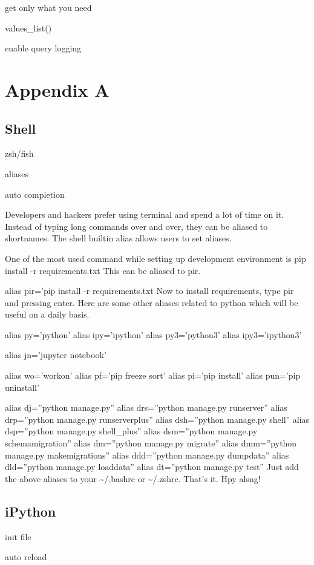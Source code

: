 \documentclass[letterpaper,11pt,english]{sphinxmanual}
\begin{document}
get only what you need

values\_list()

enable query logging


\chapter{Appendix A}
\label{\detokenize{appendix:appendix-a}}\label{\detokenize{appendix::doc}}

\section{Shell}
\label{\detokenize{appendix:shell}}
zsh/fish

aliases

auto completion

Developers and hackers prefer using terminal and spend a lot of time on it. Instead of typing long commands over and over, they can be aliased to shortnames. The shell builtin alias allows users to set aliases.

One of the most used command while setting up development environment is pip install -r requirements.txt This can be aliased to pir.

alias pir=’pip install -r requirements.txt
Now to install requirements, type pir and pressing enter. Here are some other aliases related to python which will be useful on a daily basis.

alias py=’python’
alias ipy=’ipython’
alias py3=’python3’
alias ipy3=’ipython3’

alias jn=’jupyter notebook’

alias wo=’workon’
alias pf=’pip freeze \textbar{} sort’
alias pi=’pip install’
alias pun=’pip uninstall’

alias dj=”python manage.py”
alias drs=”python manage.py runserver”
alias drp=”python manage.py runserverplus”
alias dsh=”python manage.py shell”
alias dsp=”python manage.py shell\_plus”
alias dsm=”python manage.py schemamigration”
alias dm=”python manage.py migrate”
alias dmm=”python manage.py makemigrations”
alias ddd=”python manage.py dumpdata”
alias dld=”python manage.py loaddata”
alias dt=”python manage.py test”
Just add the above aliases to your \textasciitilde{}/.bashrc or \textasciitilde{}/.zshrc. That’s it. Hpy alsng!


\section{iPython}
\label{\detokenize{appendix:ipython}}
init file

auto reload



\renewcommand{\indexname}{Index}
\printindex
\end{document}
